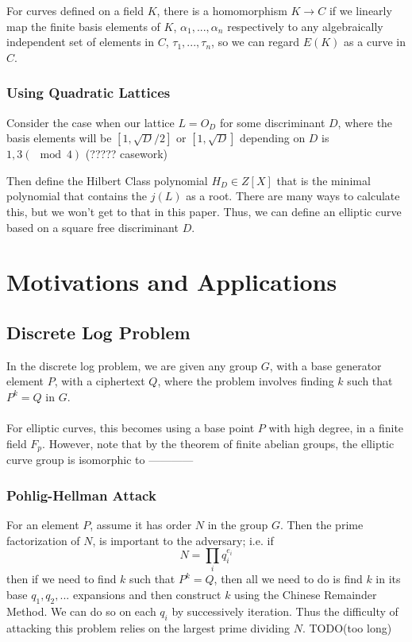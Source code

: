 \documentclass[12pt,twoside]{article}
\begin{document}
For curves defined on a field $K$, there is a homomorphism $K \rightarrow C$ if we linearly map the finite basis elements of $K$, $\alpha_{1}, ...,\alpha_{n}$ respectively to any algebraically independent set of elements in $C$, $\tau_{1},..., \tau_{n}$, so we can regard $E(K)$ as a curve in $C$.  

\subsubsection{Using Quadratic Lattices }
Consider the case when our lattice $L = O_{D}$ for some discriminant $D$, where the basis elements will be $[1, \sqrt{D}/2] $ or $[1, \sqrt{D}]$ depending on $D$ is $1, 3 (\mod 4)$ (????? casework) 

Then define the Hilbert Class polynomial $H_{D} \in Z[X]$ that is the minimal polynomial that contains the $j(L)$ as a root. There are many ways to calculate this, but we won't get to that in this paper. Thus, we can define an elliptic curve based on a square free discriminant $D$.  

\section{Motivations and Applications} 

\subsection{Discrete Log Problem}
In the discrete log problem, we are given any group $G$, with a base generator element $P$, with a ciphertext $Q$, where the problem involves finding $k$ such that $P^{k} = Q$ in $G$. \\ \\
For elliptic curves, this becomes using a base point $P$ with high degree, in a finite field $F_{p}$. However, note that by the theorem of finite abelian groups, the elliptic curve group is isomorphic to ------------

\subsubsection{Pohlig-Hellman Attack}
For an element $P$, assume it has order $N$ in the group $G$. Then the prime factorization of $N$, is important to the adversary; i.e. if 
$$ N = \prod_{i}q_{i}^{e_{i}} $$ then if we need to find $k$ such that $P^{k} = Q$, then all we need to do is find $k$ in its base $q_{1}, q_{2},...$ expansions and then construct $k$ using the Chinese Remainder Method. We can do so on each $q_{i}$ by successively iteration. Thus the difficulty of attacking this problem relies on the largest prime dividing $N$. TODO(too long) \\ 
\end{document}
